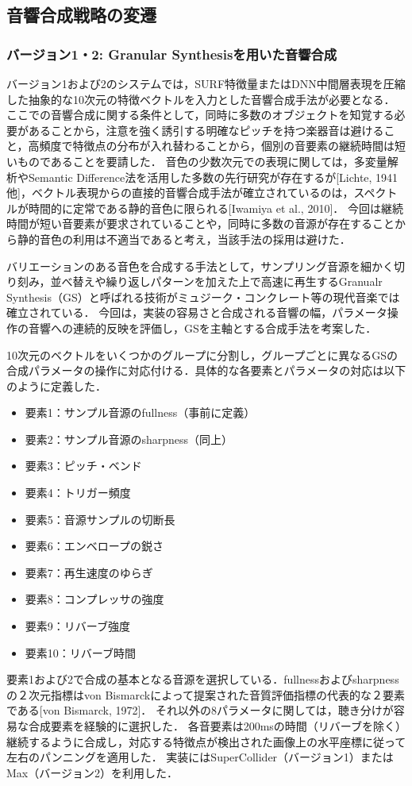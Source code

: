 \subsection{音響合成戦略の変遷}

\subsubsection{バージョン1・2: Granular Synthesisを用いた音響合成}
バージョン1および2のシステムでは，SURF特徴量またはDNN中間層表現を圧縮した抽象的な10次元の特徴ベクトルを入力とした音響合成手法が必要となる．
ここでの音響合成に関する条件として，同時に多数のオブジェクトを知覚する必要があることから，注意を強く誘引する明確なピッチを持つ楽器音は避けること，高頻度で特徴点の分布が入れ替わることから，個別の音要素の継続時間は短いものであることを要請した．
音色の少数次元での表現に関しては，多変量解析やSemantic Difference法を活用した多数の先行研究が存在するが[Lichte, 1941他]，ベクトル表現からの直接的音響合成手法が確立されているのは，スペクトルが時間的に定常である静的音色に限られる[Iwamiya et al., 2010]．
今回は継続時間が短い音要素が要求されていることや，同時に多数の音源が存在することから静的音色の利用は不適当であると考え，当該手法の採用は避けた．

バリエーションのある音色を合成する手法として，サンプリング音源を細かく切り刻み，並べ替えや繰り返しパターンを加えた上で高速に再生するGranualr Synthesis（GS）と呼ばれる技術がミュジーク・コンクレート等の現代音楽では確立されている．
今回は，実装の容易さと合成される音響の幅，パラメータ操作の音響への連続的反映を評価し，GSを主軸とする合成手法を考案した．

10次元のベクトルをいくつかのグループに分割し，グループごとに異なるGSの合成パラメータの操作に対応付ける．具体的な各要素とパラメータの対応は以下のように定義した．
\begin{itemize}
\item 要素1：サンプル音源のfullness（事前に定義）
\item 要素2：サンプル音源のsharpness（同上）
\item 要素3：ピッチ・ベンド
\item 要素4：トリガー頻度
\item 要素5：音源サンプルの切断長
\item 要素6：エンベロープの鋭さ
\item 要素7：再生速度のゆらぎ
\item 要素8：コンプレッサの強度
\item 要素9：リバーブ強度
\item 要素10：リバーブ時間
\end{itemize}
要素1および2で合成の基本となる音源を選択している．fullnessおよびsharpnessの２次元指標はvon Bismarckによって提案された音質評価指標の代表的な２要素である[von Bismarck, 1972]．
それ以外の8パラメータに関しては，聴き分けが容易な合成要素を経験的に選択した．
各音要素は200msの時間（リバーブを除く）継続するように合成し，対応する特徴点が検出された画像上の水平座標に従って左右のパンニングを適用した．
実装にはSuperCollider（バージョン1）またはMax（バージョン2）を利用した．

